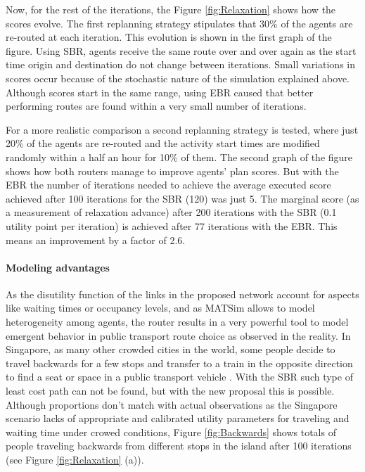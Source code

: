 Now, for the rest of the iterations, the Figure \ref{fig:Relaxation} shows how the scores evolve. The first replanning strategy stipulates that 30\% of the agents are re-routed at each iteration. This evolution is shown in the first graph of the figure. Using SBR, agents receive the same route over and over again as the start time origin and destination do not change between iterations. Small variations in scores occur because of the stochastic nature of the simulation explained above. Although scores start in the same range, using EBR caused that better performing routes are found within a very small number of iterations.

For a more realistic comparison a second replanning strategy is tested, where just 20\% of the agents are re-routed and the activity start times are modified randomly within a half an hour for 10\% of them. The second graph of the figure shows how both routers manage to improve agents' plan scores. But with the EBR the number of iterations needed to achieve the average executed score achieved after 100 iterations for the SBR (120) was just 5. The marginal score (as a measurement of relaxation advance) after 200 iterations with the SBR (0.1 utility point per iteration) is achieved after 77 iterations with the EBR. This means an improvement by a factor of 2.6.

\paragraph{Modeling advantages}

As the disutility function of the links in the proposed network account for aspects like waiting times or occupancy levels, and as MATSim allows to model heterogeneity among agents, the router results in a very powerful tool to model emergent behavior in public transport route choice as observed in the reality. In Singapore, as many other crowded cities in the world, some people decide to travel backwards for a few stops and transfer to a train in the opposite direction to find a seat or space in a public transport vehicle \cite{ChakirovErath_HKSTS_2011}. With the SBR such type of least cost path can not be found, but with the new proposal this is possible. Although proportions don't match with actual observations as the Singapore scenario lacks of appropriate and calibrated utility parameters for traveling and waiting time under crowed conditions, Figure \ref{fig:Backwards} shows totals of people traveling backwards from different stops in the island after 100 iterations (see Figure \ref{fig:Relaxation} (a)).


